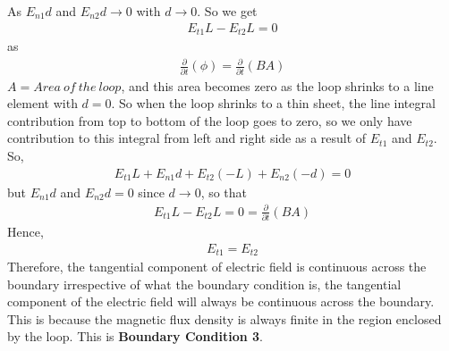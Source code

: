 As $E_{n1}d$ and $E_{n2}d\longrightarrow 0$ with $d \longrightarrow 0$. So we get 
\begin{align*}
E_{t1}L - E_{t2}L = 0
\end{align*}
as 
\begin{align*}
\frac{\partial}{\partial t}(\phi) = \frac{\partial}{\partial t}(BA
)
\end{align*}
$A =  Area\ of\ the\ loop$, and this area becomes zero as the loop shrinks to a line element with $d = 0$. So when the loop shrinks to a thin sheet, the line integral contribution from top to bottom of the loop goes to zero, so we only have contribution to this integral from left and right side as a result of $E_{t1}$ and $E_{t2}$. So, 
\begin{align*}
E_{t1}L + E_{n1}d +E_{t2}(-L) + E_{n2}(-d) = 0
\end{align*}
but $E_{n1}d$ and $E_{n2}d = 0$ since $d \longrightarrow 0$, so that 
\begin{align*}
E_{t1}L - E_{t2}L = 0 = \frac{\partial}{\partial t}(BA)
\end{align*}
Hence,
\begin{align*}
E_{t1} = E_{t2}
\end{align*}
Therefore, the tangential component of electric field is continuous across the boundary irrespective of what the boundary condition is, the tangential component of the electric field will always be continuous across the boundary. This is because the magnetic flux density is always finite in the region enclosed by the loop. This is \textbf{Boundary Condition 3}. 

